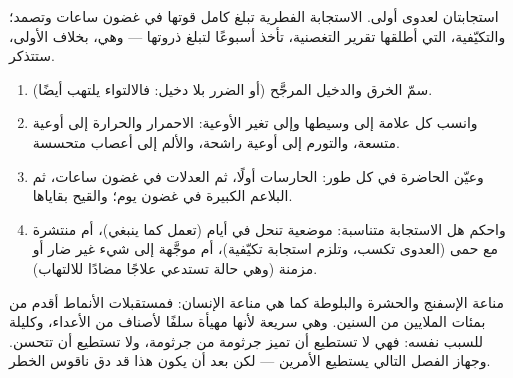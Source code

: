 \begin{omfigure}

{\small استجابتان لعدوى أولى. الاستجابة الفطرية تبلغ كامل قوتها في
غضون ساعات وتصمد؛ والتكيّفية، التي أطلقها تقرير  التغصنية،
تأخذ أسبوعًا لتبلغ ذروتها --- وهي، بخلاف الأولى، ستتذكر.}
\end{omfigure}

\begin{method}\label{met:g12:innate-immunity:read}
\begin{enumerate}
  \item سمّ الخرق والدخيل المرجَّح (أو الضرر بلا دخيل: فالالتواء يلتهب
        أيضًا).
  \item وانسب كل علامة إلى وسيطها وإلى تغير الأوعية: الاحمرار والحرارة
        إلى أوعية متسعة، والتورم إلى أوعية راشحة، والألم إلى أعصاب
        متحسسة.
  \item وعيّن  الحاضرة في كل طور: الحارسات أولًا، ثم العدلات في
        غضون ساعات، ثم البلاعم الكبيرة في غضون يوم؛ والقيح بقاياها.
  \item واحكم هل الاستجابة متناسبة: موضعية تنحل في أيام (تعمل كما
        ينبغي)، أم منتشرة مع حمى (العدوى تكسب، وتلزم استجابة تكيّفية)،
        أم موجَّهة إلى شيء غير ضار أو مزمنة (وهي حالة تستدعي علاجًا
        مضادًا للالتهاب).
\end{enumerate}
\end{method}

\begin{remark}\label{rem:g12:innate-immunity:old}
 مناعة الإسفنج والحشرة والبلوطة كما هي مناعة الإنسان:
فمستقبلات الأنماط  أقدم من  بمئات الملايين من
السنين. وهي سريعة لأنها مهيأة سلفًا لأصناف من الأعداء، وكليلة للسبب
نفسه: فهي لا تستطيع أن تميز جرثومة من جرثومة، ولا تستطيع أن تتحسن.
وجهاز الفصل التالي يستطيع الأمرين --- لكن بعد أن يكون هذا قد دق ناقوس
الخطر.
\end{remark}

